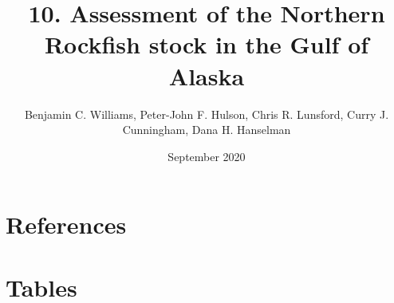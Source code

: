 \documentclass[
  11pt,
]{article}
\title{10. Assessment of the Northern Rockfish stock in the Gulf of Alaska}
\author{Benjamin C. Williams, Peter-John F. Hulson, Chris R. Lunsford, Curry J. Cunningham, Dana H. Hanselman}
\date{September 2020}
\begin{document}
\maketitle


\hypertarget{references}{%
\section*{References}\label{references}}

\hypertarget{refs}{}

\pagebreak

\hypertarget{tables}{%
\section{Tables}\label{tables}}
\end{document}
